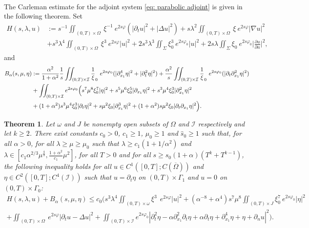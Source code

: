 \documentclass[a4paper, 12pt]{article}
\theoremstyle{plain}
\newtheorem{theorem}{Theorem}[section]
\theoremstyle{definition}
\numberwithin{theorem}{section}
\numberwithin{equation}{section}
\begin{document}
\
\\
The Carleman estimate for the adjoint system \eqref{eq: parabolic adjoint} is given in the following theorem. 
Set
\begin{align*}
 H(s, \lambda, u)&:= s^{-1}\iint_{(0,T)\times\Omega}~\xi^{-1}~e^{2s\varphi}\left(|\partial_tu|^2+|\Delta u|^2\right)+s\lambda^2\iint_{(0,T)\times\Omega}~\xi~e^{2s\varphi}|\nabla u|^2\\ 
   &+s^3\lambda^4\iint_{(0,T)\times\Omega}~\xi^3~e^{2s\varphi}|u|^2+2s^3\lambda^3\iint_\Sigma\xi_0^3~e^{2s\varphi_0}|u|^2+2s\lambda\iint_\Sigma\xi_0~e^{2s\varphi_0}\big|\frac{\partial u}{\partial n}\big|^2,
\end{align*}
and
\begin{align*}
 B_\alpha(s, \mu, \eta)&:=  \frac{\alpha^2}{1+\alpha^2}\frac1s\iint_{(0,T)\times\mathcal{I}}\frac1\xi_0~e^{2s\varphi_0}(|\partial^4_{x_1}\eta|^2+|\partial^2_t\eta|^2)+\frac{\alpha^2}{s}\iint_{(0,T)\times\mathcal{I}}\frac1\xi_0~e^{2s\varphi_0}(|\partial_t\partial^2_{x_1}\eta|^2)\\& \notag+\iint_{(0,T)\times\mathcal{I}}e^{2s\varphi_0}\Big(s^7\mu^8\xi^7_0|\eta|^2+s^5\mu^6\xi_0^5|\partial_{x_1}\eta|^2+s^3\mu^4\xi_0^3|\partial^2_{x_1}\eta|^2\\ \notag &+(1+\alpha^2)s^3\mu^4\xi_0^3|\partial_t\eta|^2+s\mu^2\xi_0|\partial^3_{x_1}\eta|^2+(1+\alpha^2)s\mu^2\xi_0|\partial_t\partial_{x_1}\eta|^2\Big).
\end{align*}
\begin{theorem}\label{Carleman-couplé}
Let $\omega$ and $J$ be nonempty open subsets of $\Omega$ and $\mathcal{I}$ respectively and let $k\geq 2$. There exist constants $c_0>0$, $c_1 \geq 1$, $\mu_0\geq 1$ and $\widehat{s}_0\geq 1$ such that, for all $\alpha>0$, for all $\lambda\geq \mu\geq \mu_0$ such that $\lambda\geq c_1(1+1/\alpha^2)$ and $\lambda\in [c_1\alpha^{2/3}\mu^{\frac43}, \frac{1+\alpha^2}{c_1}\mu^2]$, for all $T>0$ and for all $s\geq \widehat{s}_0(1+\alpha)(T^k+T^{k-1})$, the following inequality holds for all $u\in C^1([0,T];C(\overline{\Omega}))$ and $\eta\in C^2([0,T];C^4(\mathcal{I}))$ such that $u=\partial_t \eta$ on $(0,T)\times\Gamma_1$ and $u=0$ on $(0,T)\times\Gamma_0$:
\begin{multline}\label{EqCarleman-couplé}
 H(s, \lambda, u)+ B_\alpha (s, \mu, \eta)\leq c_0\Big( s^3\lambda^4\iint_{(0,T)\times\omega} \xi^3~~e^{2s\varphi}| u|^2+ \left(\alpha^{-8}+\alpha^4\right)s^7\mu^8\iint_{(0,T)\times J}\xi^7_0~e^{2s\varphi_0}|\eta|^2\\ 
 +\iint_{(0,T)\times\Omega}~e^{2s\varphi}|\partial_tu-\Delta u|^2+\iint_{(0,T)\times\mathcal{I}}e^{2s\varphi_0}|\partial^2_t\eta-\alpha\partial^2_{x_1}\partial_t\eta+\alpha\partial_t\eta+\partial^4_{x_1}\eta+\eta+\partial_nu|^2\Big).
\end{multline}
\end{theorem}
\end{document}
